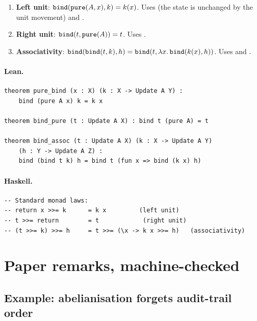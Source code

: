 \documentclass[11pt,a4paper]{article}
\begin{document}
\begin{thm}
\begin{enumerate}
  \item \textbf{Left unit}: $\texttt{bind}(\texttt{pure}(A, x), k) = k(x)$.
    Uses  (the state is unchanged by the unit movement)
    and .
  \item \textbf{Right unit}: $\texttt{bind}(t, \texttt{pure}(A)) = t$.
    Uses .
  \item \textbf{Associativity}: $\texttt{bind}(\texttt{bind}(t, k), h) =
    \texttt{bind}(t, \lambda x.\, \texttt{bind}(k(x), h))$.
    Uses  and .
\end{enumerate}
\end{thm}

\paragraph{Lean.}
\begin{lstlisting}[style=lean]
theorem pure_bind (x : X) (k : X -> Update A Y) :
    bind (pure A x) k = k x

theorem bind_pure (t : Update A X) : bind t (pure A) = t

theorem bind_assoc (t : Update A X) (k : X -> Update A Y)
    (h : Y -> Update A Z) :
    bind (bind t k) h = bind t (fun x => bind (k x) h)
\end{lstlisting}

\paragraph{Haskell.}
\begin{lstlisting}[style=haskell]
-- Standard monad laws:
-- return x >>= k      = k x         (left unit)
-- t >>= return        = t            (right unit)
-- (t >>= k) >>= h     = t >>= (\x -> k x >>= h)   (associativity)
\end{lstlisting}


\section{Paper remarks, machine-checked}

\subsection{Example: abelianisation forgets audit-trail order}
\end{document}
